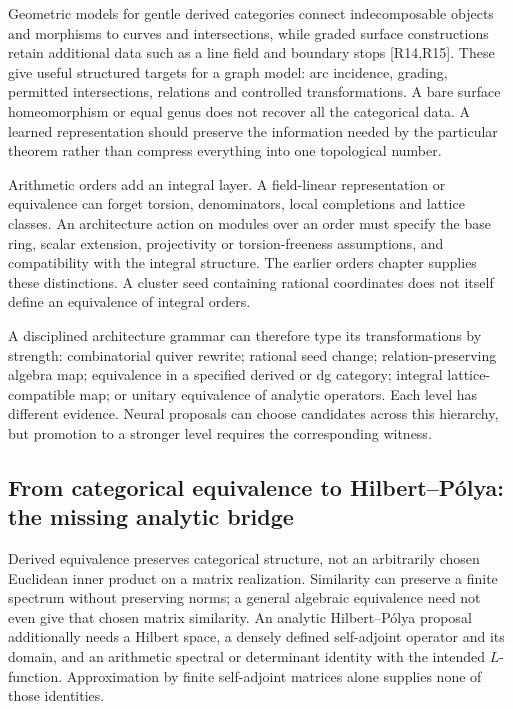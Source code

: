 Geometric models for gentle derived categories connect indecomposable objects and morphisms to curves and intersections, while graded surface constructions retain additional data such as a line field and boundary stops [R14,R15]. These give useful structured targets for a graph model: arc incidence, grading, permitted intersections, relations and controlled transformations. A bare surface homeomorphism or equal genus does not recover all the categorical data. A learned representation should preserve the information needed by the particular theorem rather than compress everything into one topological number.

Arithmetic orders add an integral layer. A field-linear representation or equivalence can forget torsion, denominators, local completions and lattice classes. An architecture action on modules over an order must specify the base ring, scalar extension, projectivity or torsion-freeness assumptions, and compatibility with the integral structure. The earlier orders chapter supplies these distinctions. A cluster seed containing rational coordinates does not itself define an equivalence of integral orders.

A disciplined architecture grammar can therefore type its transformations by strength: combinatorial quiver rewrite; rational seed change; relation-preserving algebra map; equivalence in a specified derived or dg category; integral lattice-compatible map; or unitary equivalence of analytic operators. Each level has different evidence. Neural proposals can choose candidates across this hierarchy, but promotion to a stronger level requires the corresponding witness.

\subsection{From categorical equivalence to Hilbert--P\'olya: the missing analytic bridge}

Derived equivalence preserves categorical structure, not an arbitrarily chosen Euclidean inner product on a matrix realization. Similarity can preserve a finite spectrum without preserving norms; a general algebraic equivalence need not even give that chosen matrix similarity. An analytic Hilbert--P\'olya proposal additionally needs a Hilbert space, a densely defined self-adjoint operator and its domain, and an arithmetic spectral or determinant identity with the intended $L$-function. Approximation by finite self-adjoint matrices alone supplies none of those identities.

